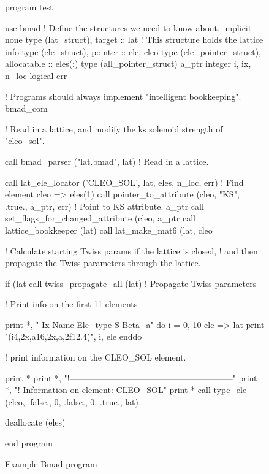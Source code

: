 \begin{figure}[htp]
\begin{listing}{1}
program test

use bmad                 ! Define the structures we need to know about.
implicit none
type (lat_struct), target :: lat   ! This structure holds the lattice info
type (ele_struct), pointer :: ele, cleo
type (ele_pointer_struct), allocatable :: eles(:)
type (all_pointer_struct) a_ptr
integer i, ix, n_loc
logical err

! Programs should always implement "intelligent bookkeeping".
bmad_com%

! Read in a lattice, and modify the ks solenoid strength of "cleo_sol".

call bmad_parser ("lat.bmad", lat)  ! Read in a lattice.

call lat_ele_locator ('CLEO_SOL', lat, eles, n_loc, err)  ! Find element
cleo => eles(1)%
call pointer_to_attribute (cleo, "KS", .true., a_ptr, err) ! Point to KS attribute.
a_ptr%
call set_flags_for_changed_attribute (cleo, a_ptr%
call lattice_bookkeeper (lat)
call lat_make_mat6 (lat, cleo%

! Calculate starting Twiss params if the lattice is closed, 
! and then propagate the Twiss parameters through the lattice.

if (lat%
call twiss_propagate_all (lat)      ! Propagate Twiss parameters

! Print info on the first 11 elements

print *, " Ix  Name              Ele_type                   S      Beta_a"
do i = 0, 10
  ele => lat%
  print "(i4,2x,a16,2x,a,2f12.4)", i, ele%
enddo

! print information on the CLEO_SOL element.

print *
print *, "!---------------------------------------------------------"
print *, "! Information on element: CLEO_SOL"
print *
call type_ele (cleo, .false., 0, .false., 0, .true., lat)

deallocate (eles)

end program
\end{listing}
\caption{Example Bmad program}
\label{f:program}
\end{figure}

